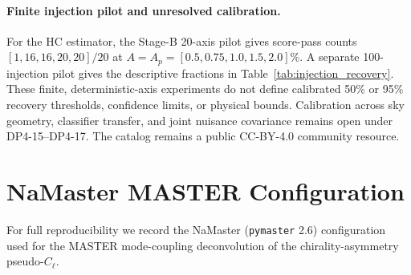 \documentclass[aps,prd,twocolumn,superscriptaddress,preprintnumbers,nofootinbib,longbibliography,floatfix]{revtex4-2}
\begin{document}
\paragraph{Finite injection pilot and unresolved calibration.}
For the HC estimator, the Stage-B 20-axis pilot gives score-pass counts $[1,16,16,20,20]/20$ at $A=A_p=[0.5,0.75,1.0,1.5,2.0]\%$. A separate 100-injection pilot gives the descriptive fractions in Table~\ref{tab:injection_recovery}. These finite, deterministic-axis experiments do not define calibrated 50\% or 95\% recovery thresholds, confidence limits, or physical bounds. Calibration across sky geometry, classifier transfer, and joint nuisance covariance remains open under DP4-15--DP4-17. The catalog remains a public CC-BY-4.0 community resource.

\appendix

\section{NaMaster MASTER Configuration}
\label{sec:namaster_config}

For full reproducibility we record the NaMaster (\texttt{pymaster} 2.6) configuration used for the MASTER mode-coupling deconvolution of the chirality-asymmetry pseudo-$C_\ell$.
\end{document}
